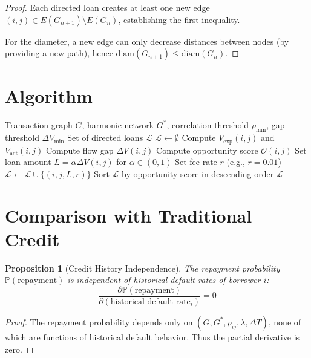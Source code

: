 \documentclass[12pt]{article}
\newtheorem{proposition}[theorem]{Proposition}
\begin{document}
\begin{proof}
Each directed loan creates at least one new edge $(i,j) \in E(G_{n+1}) \setminus E(G_n)$, establishing the first inequality.

For the diameter, a new edge can only decrease distances between nodes (by providing a new path), hence $\text{diam}(G_{n+1}) \leq \text{diam}(G_n)$.
\end{proof}

\section{Algorithm}

\begin{algorithm}
\caption{Directed Loan Allocation}
\begin{algorithmic}[1]
\REQUIRE Transaction graph $G$, harmonic network $G^*$, correlation threshold $\rho_{\text{min}}$, gap threshold $\Delta V_{\text{min}}$
\ENSURE Set of directed loans $\mathcal{L}$
\STATE $\mathcal{L} \leftarrow \emptyset$
    \STATE Compute $V_{\text{exp}}(i,j)$ and $V_{\text{act}}(i,j)$
    \STATE Compute flow gap $\Delta V(i,j)$
        \STATE Compute opportunity score $\mathcal{O}(i,j)$
        \STATE Set loan amount $L = \alpha \Delta V(i,j)$ for $\alpha \in (0,1)$
        \STATE Set fee rate $r$ (e.g., $r = 0.01$)
        \STATE $\mathcal{L} \leftarrow \mathcal{L} \cup \{(i,j,L,r)\}$
    \ENDIF
\ENDFOR
\STATE Sort $\mathcal{L}$ by opportunity score in descending order
\RETURN $\mathcal{L}$
\end{algorithmic}
\end{algorithm}

\section{Comparison with Traditional Credit}

\begin{proposition}[Credit History Independence]
The repayment probability $\mathbb{P}(\text{repayment})$ is independent of historical default rates of borrower $i$:
$$
\frac{\partial \mathbb{P}(\text{repayment})}{\partial (\text{historical default rate}_i)} = 0
$$
\end{proposition}

\begin{proof}
The repayment probability depends only on $(G, G^*, \rho_{ij}, \lambda, \Delta T)$, none of which are functions of historical default behavior. Thus the partial derivative is zero.
\end{proof}
\end{document}
